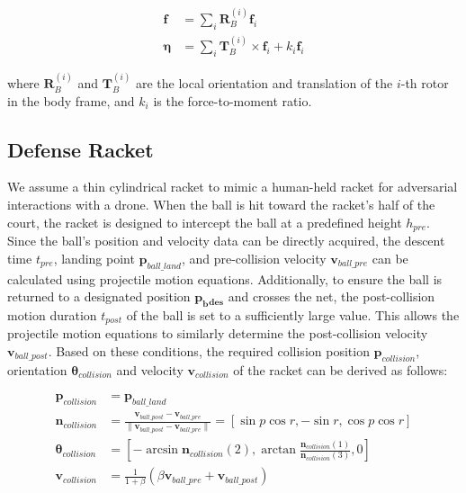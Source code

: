 \begin{align}
\bm{f} &= \sum_{i} \bm{R}^{(i)}_B \bm{f}_i \\
\bm{\eta} &= \sum_{i} \bm{T}^{(i)}_B \times \bm{f}_i + k_i \bm{f}_i
\end{align}

where $\bm{R}^{(i)}_B$ and $\bm{T}^{(i)}_B$ are the local orientation and translation of the $i$-th rotor in the body frame, and $k_i$ is the force-to-moment ratio.


\subsection{Defense Racket}

We assume a thin cylindrical racket to mimic a human-held racket for adversarial interactions with a drone. 
When the ball is hit toward the racket’s half of the court, the racket is designed to intercept the ball at a predefined height $h_{pre}$. Since the ball’s position and velocity data can be directly acquired, the descent time $t_{pre}$, landing point $\bm{p}_{ball\_land}$, and pre-collision velocity $\bm{v}_{ball\_pre}$ can be calculated using projectile motion equations. Additionally, to ensure the ball is returned to a designated position $\boldsymbol{p_b{}_{des}}$ and crosses the net, the post-collision motion duration $t_{post}$ of the ball is set to a sufficiently large value. This allows the projectile motion equations to similarly determine the post-collision velocity $\bm{v}_{ball\_post}$. Based on these conditions, the required collision position $\bm{p}_{collision}$, orientation $\bm{\theta}_{collision}$ and velocity $\bm{v}_{collision}$ of the racket can be derived  as follows:

\begin{align}
\bm{p}_{collision} &= \bm{p}_{ball\_land} \\
\bm{n}_{collision} &= \frac{\bm{v}_{ball\_post} - \bm{v}_{ball\_pre}}{\| \bm{v}_{ball\_post} - \bm{v}_{ball\_pre} \|} = [\sin p\cos r, -\sin r, \cos p\cos r] \\
\bm{\theta}_{collision} &= [-\arcsin {\bm{n}_{collision}}(2), \arctan {\frac{\bm{n}_{collision}(1)}{\bm{n}_{collision}(3)}}, 0] \\
\bm{v}_{collision} &= \frac{1}{1+\beta}(\beta \bm{v}_{ball\_pre} + \bm{v}_{ball\_post})
\end{align}

